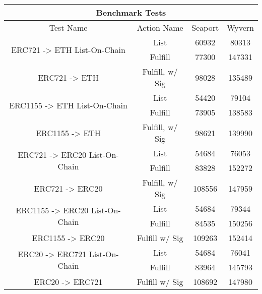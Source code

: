 \documentclass[12pt]{article}
\begin{document}
\begin{center}
\begin{tabular}{ |c|c|c|c| } 
\hline
\multicolumn{4}{|c|}{Benchmark Tests} \\ 
\hline 
 Test Name & Action Name & Seaport & Wyvern \\ 
\hline\hline
\multirow{2}{16em}{ERC721 -> ETH List-On-Chain}& List & \color[RGB]{0,128,0} 60932 & \color[RGB]{255,0,0} 80313 \\
\cline{2-4}& Fulfill & \color[RGB]{0,128,0} 77300 & \color[RGB]{255,0,0} 147331 \\
\cline{2-4}\cline{0-1} 
\multirow{1}{16em}{ERC721 -> ETH}& Fulfill, w/ Sig & \color[RGB]{0,128,0} 98028 & \color[RGB]{255,0,0} 135489 \\
\cline{2-4}\cline{0-1} 
\multirow{2}{16em}{ERC1155 -> ETH List-On-Chain}& List & \color[RGB]{0,128,0} 54420 & \color[RGB]{255,0,0} 79104 \\
\cline{2-4}& Fulfill & \color[RGB]{0,128,0} 73905 & \color[RGB]{255,0,0} 138583 \\
\cline{2-4}\cline{0-1} 
\multirow{1}{16em}{ERC1155 -> ETH}& Fulfill, w/ Sig & \color[RGB]{0,128,0} 98621 & \color[RGB]{255,0,0} 139990 \\
\cline{2-4}\cline{0-1} 
\multirow{2}{16em}{ERC721 -> ERC20 List-On-Chain}& List & \color[RGB]{0,128,0} 54684 & \color[RGB]{255,0,0} 76053 \\
\cline{2-4}& Fulfill & \color[RGB]{0,128,0} 83828 & \color[RGB]{255,0,0} 152272 \\
\cline{2-4}\cline{0-1} 
\multirow{1}{16em}{ERC721 -> ERC20}& Fulfill, w/ Sig & \color[RGB]{0,128,0} 108556 & \color[RGB]{255,0,0} 147959 \\
\cline{2-4}\cline{0-1} 
\multirow{2}{16em}{ERC1155 -> ERC20 List-On-Chain}& List & \color[RGB]{0,128,0} 54684 & \color[RGB]{255,0,0} 79344 \\
\cline{2-4}& Fulfill & \color[RGB]{0,128,0} 84535 & \color[RGB]{255,0,0} 150256 \\
\cline{2-4}\cline{0-1} 
\multirow{1}{16em}{ERC1155 -> ERC20}& Fulfill w/ Sig & \color[RGB]{0,128,0} 109263 & \color[RGB]{255,0,0} 152414 \\
\cline{2-4}\cline{0-1} 
\multirow{2}{16em}{ERC20 -> ERC721 List-On-Chain}& List & \color[RGB]{0,128,0} 54684 & \color[RGB]{255,0,0} 76041 \\
\cline{2-4}& Fulfill & \color[RGB]{0,128,0} 83964 & \color[RGB]{255,0,0} 145793 \\
\cline{2-4}\cline{0-1} 
\multirow{1}{16em}{ERC20 -> ERC721}& Fulfill w/ Sig & \color[RGB]{0,128,0} 108692 & \color[RGB]{255,0,0} 147980 \\

\end{tabular}
\end{center}
\end{document}

